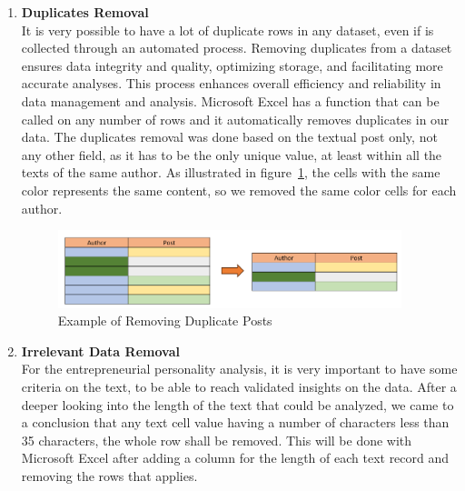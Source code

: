 \begin{enumerate}
\item \textbf{Duplicates Removal}\\
It is very possible to have a lot of duplicate rows in any dataset, even if is collected through an automated process. Removing duplicates from a dataset ensures data integrity and quality, optimizing storage, and facilitating more accurate analyses. This process enhances overall efficiency and reliability in data management and analysis. Microsoft Excel has a function that can be called on any number of rows and it automatically removes duplicates in our data. The duplicates removal was done based on the textual post only, not any other field, as it has to be the only unique value, at least within all the texts of the same author. As illustrated in figure~\ref{fig:duplicate}, the cells with the same color represents the same content, so we removed the same color cells for each author.
\begin{figure}[H]
\centering
\includegraphics[width=10cm]{duplicates}
\caption{Example of Removing Duplicate Posts}
\label{fig:duplicate}
\end{figure}

\item \textbf{Irrelevant Data Removal}\\
For the entrepreneurial personality analysis, it is very important to have some criteria on the text, to be able to reach validated insights on the data. After a deeper looking into the length of the text that could be analyzed, we came to a conclusion that any text cell value having a number of characters less than 35 characters, the whole row shall be removed. This will be done with Microsoft Excel after adding a column for the length of each text record and removing the rows that applies. 


\end{enumerate}
